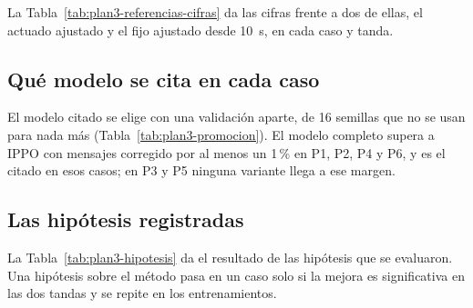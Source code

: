 La Tabla~\ref{tab:plan3-referencias-cifras} da las cifras frente a dos
de ellas, el actuado ajustado y el fijo ajustado desde 10~s, en cada
caso y tanda.

\begin{table}[H]
\centering
\footnotesize
\setlength{\tabcolsep}{3pt}

\caption[Segundo estudio: cambio frente al actuado ajustado y al fijo ajustado desde 10~s]{Cambio del retraso total del modelo citado frente al actuado ajustado y frente al fijo ajustado desde 10~s, con llegadas aleatorias, en la tanda 1 y en la tanda 2.}
\label{tab:plan3-referencias-cifras}
\end{table}

\subsection*{Qué modelo se cita en cada caso}

El modelo citado se elige con una validación aparte, de 16 semillas que
no se usan para nada más (Tabla~\ref{tab:plan3-promocion}). El modelo
completo supera a IPPO con mensajes corregido por al menos un 1\,\% en
P1, P2, P4 y P6, y es el citado en esos casos; en P3 y P5 ninguna
variante llega a ese margen.

\begin{table}[H]
\centering
\footnotesize
\setlength{\tabcolsep}{3pt}

\caption[Segundo estudio: elección del modelo citado]{Elección del modelo citado con llegadas aleatorias: cambio del retraso total de cada variante frente a IPPO con mensajes corregido, en las 16 semillas de la validación de promoción. Se cita la variante de menor retraso si mejora al menos un 1\,\%. La decisión cada 2~s sola se probó en tres casos.}
\label{tab:plan3-promocion}
\end{table}

\subsection*{Las hipótesis registradas}

La Tabla~\ref{tab:plan3-hipotesis} da el resultado de las hipótesis que
se evaluaron. Una hipótesis sobre el método pasa en un caso solo si la
mejora es significativa en las dos tandas y se repite en los
entrenamientos.

